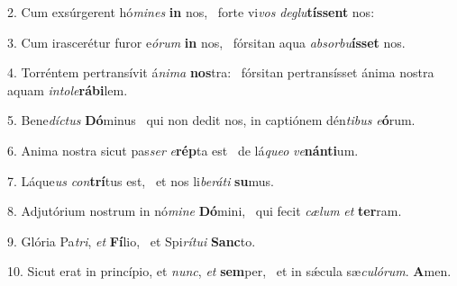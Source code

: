 2. Cum exsúrgerent hó\textit{mi}\textit{nes} \textbf{in} nos, \ast\  forte vi\textit{vos} \textit{de}\textit{glu}\textbf{tís}\textbf{sent} nos:\

3. Cum irascerétur furor e\textit{ó}\textit{rum} \textbf{in} nos, \ast\  fórsitan aqua \textit{ab}\textit{sor}\textit{bu}\textbf{ís}\textbf{set} nos.\

4. Torréntem pertransívit á\textit{ni}\textit{ma} \textbf{nos}tra: \ast\  fórsitan pertransísset ánima nostra aquam \textit{in}\textit{to}\textit{le}\textbf{rá}\textbf{bi}lem.\

5. Bene\textit{díc}\textit{tus} \textbf{Dó}minus \ast\  qui non dedit nos, in captiónem dén\textit{ti}\textit{bus} \textit{e}\textbf{ó}rum.\

6. Anima nostra sicut pas\textit{ser} \textit{e}\textbf{rép}ta est \ast\  de lá\textit{que}\textit{o} \textit{ve}\textbf{nán}\textbf{ti}um.\

7. Láque\textit{us} \textit{con}\textbf{trí}tus est, \ast\  et nos li\textit{be}\textit{rá}\textit{ti} \textbf{su}mus.\

8. Adjutórium nostrum in nó\textit{mi}\textit{ne} \textbf{Dó}mini, \ast\  qui fecit \textit{cæ}\textit{lum} \textit{et} \textbf{ter}ram.\

9. Glória Pa\textit{tri}, \textit{et} \textbf{Fí}lio, \ast\  et Spi\textit{rí}\textit{tu}\textit{i} \textbf{Sanc}to.\

10. Sicut erat in princípio, et \textit{nunc}, \textit{et} \textbf{sem}per, \ast\  et in sǽcula sæ\textit{cu}\textit{ló}\textit{rum}. \textbf{A}men.\

